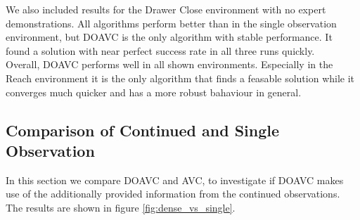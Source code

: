 We also included results for the Drawer Close environment with no expert demonstrations. All algorithms perform better than in the single observation environment, 
but DOAVC is the only algorithm with stable performance. It found a solution with near perfect success rate in all three runs quickly. \\

Overall, DOAVC performs well in all shown environments. Especially in the Reach environment it is the only algorithm that finds a feasable solution while it 
converges much quicker and has a more robust bahaviour in general. 






\subsection{Comparison of Continued and Single Observation}
\label{sec:com_coavc_avc}
In this section we compare DOAVC and AVC, to investigate if DOAVC makes use of the additionally provided information from the continued observations. 
The results are shown in figure \ref{fig:dense_vs_single}.\\

